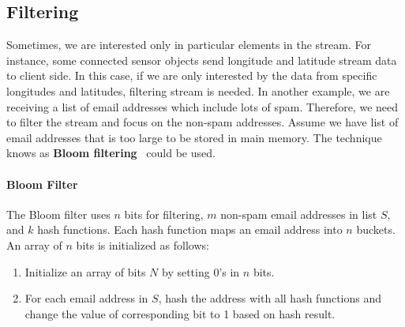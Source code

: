 \subsection{Filtering}

Sometimes, we are interested only in particular elements in the stream. For
instance, some connected sensor objects send longitude and
latitude stream data to client side. In this case, if we are only interested by
the data from specific longitudes and latitudes, filtering stream is needed.
In another example, we are receiving a list of email addresses which include lots
of spam. Therefore, we need to filter the stream and focus on the non-spam
addresses. Assume we have list of email addresses that is too large to be stored
in main memory. The technique knows as \textbf{Bloom
filtering}~\cite{bloom1970space} could be used. 

\paragraph{Bloom Filter}

The Bloom filter uses $n$ bits for filtering, $m$ non-spam email
addresses in list $S$, and $k$ hash functions. Each hash function maps an email
address into $n$ buckets. An array of $n$ bits is initialized as follows: 
\begin{enumerate}
  \item Initialize an array of bits $N$ by setting 0's in $n$ bits.
  
  \item For each email address in $S$, hash the address with all
  hash functions and change the value of corresponding bit to 1 based on hash
  result.
\end{enumerate}



